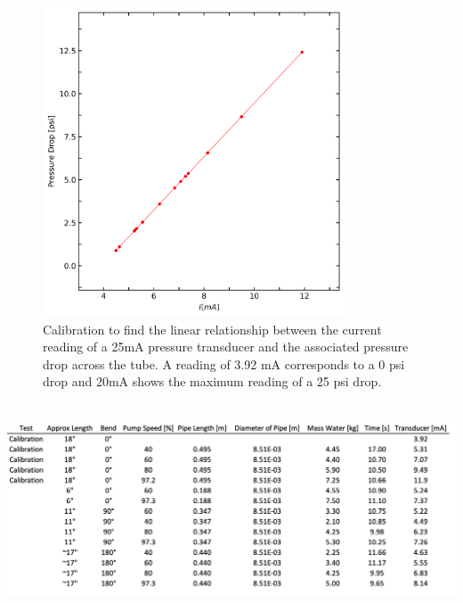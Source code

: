 \documentclass{article}
\begin{document}
\begin{figure}[H]
\centering
\includegraphics[width=0.8\textwidth]{images/transducer_psi_mA.png}
\caption{\label{fig1}Calibration to find the linear relationship between the current reading of a 25mA pressure transducer and the associated pressure drop across the tube. A reading of 3.92 mA corresponds to a 0 psi drop and 20mA shows the maximum reading of a 25 psi drop.}
\end{figure}

\caption{\label{fig1}\\ Table 1: Different Friction Factor Models are valid within different ranges of the Reynolds's number}
\linebreak \\ 
\centering\includegraphics[width=1\textwidth]{images/rawdata.png}\raggedright
\end{document}
